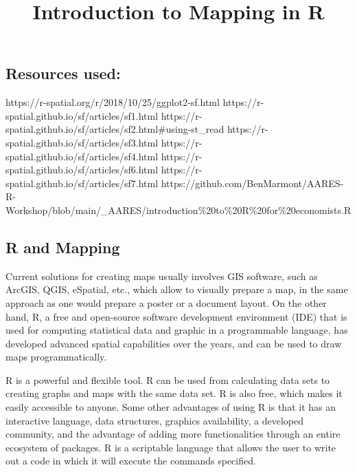 \documentclass[
  letterpaper,
  DIV=11,
  numbers=noendperiod]{scrartcl}
\title{Introduction to Mapping in R}
\author{}
\date{}
\begin{document}
\maketitle
\ifdefined\Shaded\renewenvironment{Shaded}{\begin{tcolorbox}[boxrule=0pt, breakable, enhanced, frame hidden, borderline west={3pt}{0pt}{shadecolor}, interior hidden, sharp corners]}{\end{tcolorbox}}\fi

\hypertarget{resources-used}{%
\subsection{Resources used:}\label{resources-used}}

https://r-spatial.org/r/2018/10/25/ggplot2-sf.html
https://r-spatial.github.io/sf/articles/sf1.html
https://r-spatial.github.io/sf/articles/sf2.html\#using-st\_read
https://r-spatial.github.io/sf/articles/sf3.html
https://r-spatial.github.io/sf/articles/sf4.html
https://r-spatial.github.io/sf/articles/sf6.html
https://r-spatial.github.io/sf/articles/sf7.html
https://github.com/BenMarmont/AARES-R-Workshop/blob/main/\_AARES/introduction\%20to\%20R\%20for\%20economists.R

\hypertarget{r-and-mapping}{%
\subsection{R and Mapping}\label{r-and-mapping}}

Current solutions for creating maps usually involves GIS software, such
as ArcGIS, QGIS, eSpatial, etc., which allow to visually prepare a map,
in the same approach as one would prepare a poster or a document layout.
On the other hand, R, a free and open-source software development
environment (IDE) that is used for computing statistical data and
graphic in a programmable language, has developed advanced spatial
capabilities over the years, and can be used to draw maps
programmatically.

R is a powerful and flexible tool. R can be used from calculating data
sets to creating graphs and maps with the same data set. R is also free,
which makes it easily accessible to anyone. Some other advantages of
using R is that it has an interactive language, data structures,
graphics availability, a developed community, and the advantage of
adding more functionalities through an entire ecosystem of packages. R
is a scriptable language that allows the user to write out a code in
which it will execute the commands specified.
\end{document}
